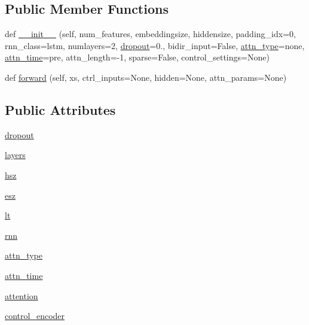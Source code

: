 \subsection*{Public Member Functions}
\begin{DoxyCompactItemize}
\item 
def \hyperlink{classcontrollable__seq2seq_1_1modules_1_1RNNDecoder_a01d95a7a5450b2c5dbe4ad0adbdd0c3c}{\+\_\+\+\_\+init\+\_\+\+\_\+} (self, num\+\_\+features, embeddingsize, hiddensize, padding\+\_\+idx=0, rnn\+\_\+class=\textquotesingle{}lstm\textquotesingle{}, numlayers=2, \hyperlink{classcontrollable__seq2seq_1_1modules_1_1RNNDecoder_a523760e8b5123776ed31687d83597a79}{dropout}=0., bidir\+\_\+input=False, \hyperlink{classcontrollable__seq2seq_1_1modules_1_1RNNDecoder_a3116c04f0332bd82793b28eb524a10cf}{attn\+\_\+type}=\textquotesingle{}none\textquotesingle{}, \hyperlink{classcontrollable__seq2seq_1_1modules_1_1RNNDecoder_a9d61c37108fbae1fe406a6e9060d8835}{attn\+\_\+time}=\textquotesingle{}pre\textquotesingle{}, attn\+\_\+length=-\/1, sparse=False, control\+\_\+settings=None)
\item 
def \hyperlink{classcontrollable__seq2seq_1_1modules_1_1RNNDecoder_af72b9bf152e1c9fc931623af39723018}{forward} (self, xs, ctrl\+\_\+inputs=None, hidden=None, attn\+\_\+params=None)
\end{DoxyCompactItemize}
\subsection*{Public Attributes}
\begin{DoxyCompactItemize}
\item 
\hyperlink{classcontrollable__seq2seq_1_1modules_1_1RNNDecoder_a523760e8b5123776ed31687d83597a79}{dropout}
\item 
\hyperlink{classcontrollable__seq2seq_1_1modules_1_1RNNDecoder_a3afd2eb94925a37ad30f2280054a7740}{layers}
\item 
\hyperlink{classcontrollable__seq2seq_1_1modules_1_1RNNDecoder_ac66bcce976283ccc13fff16392f177e7}{hsz}
\item 
\hyperlink{classcontrollable__seq2seq_1_1modules_1_1RNNDecoder_a38ea7dad4316071de32369bca62d2706}{esz}
\item 
\hyperlink{classcontrollable__seq2seq_1_1modules_1_1RNNDecoder_a3167b4c51b0b099778efeeedb73962d7}{lt}
\item 
\hyperlink{classcontrollable__seq2seq_1_1modules_1_1RNNDecoder_afd3aee0e3d5cfff379453a6fe667cd4c}{rnn}
\item 
\hyperlink{classcontrollable__seq2seq_1_1modules_1_1RNNDecoder_a3116c04f0332bd82793b28eb524a10cf}{attn\+\_\+type}
\item 
\hyperlink{classcontrollable__seq2seq_1_1modules_1_1RNNDecoder_a9d61c37108fbae1fe406a6e9060d8835}{attn\+\_\+time}
\item 
\hyperlink{classcontrollable__seq2seq_1_1modules_1_1RNNDecoder_a06774cf88c306597d103ee623cf22224}{attention}
\item 
\hyperlink{classcontrollable__seq2seq_1_1modules_1_1RNNDecoder_a2e6c7015206a87964c598c66cd2ea697}{control\+\_\+encoder}
\end{DoxyCompactItemize}


